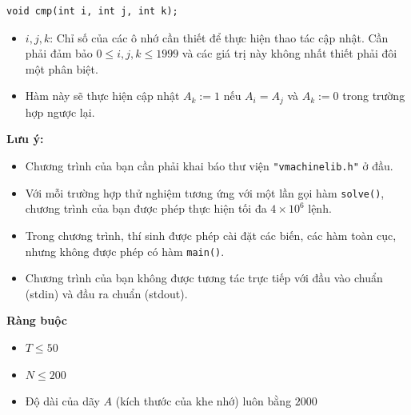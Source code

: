 \begin{lstlisting}
void cmp(int i, int j, int k);
\end{lstlisting}

\begin{itemize}
   \item $i,j,k$: Chỉ số của các ô nhớ cần thiết để thực hiện thao tác cập nhật. Cần phải đảm bảo $0\le i,j,k\le 1999$ và các giá trị này không nhất thiết phải đôi một phân biệt.
   \item Hàm này sẽ thực hiện cập nhật $A_k:=1$ nếu $A_i=A_j$ và $A_k:=0$ trong trường hợp ngược lại.
\end{itemize}

\textbf{Lưu ý:}
\begin{itemize}
   \item Chương trình của bạn cần phải khai báo thư viện \texttt{"vmachinelib.h"} ở đầu.
   \item Với mỗi trường hợp thử nghiệm tương ứng với một lần gọi hàm \texttt{solve()}, chương trình của bạn được phép thực hiện tối đa $4\times 10^6$ lệnh.
   \item Trong chương trình, thí sinh được phép cài đặt các biến, các hàm toàn cục, nhưng không được phép có hàm \texttt{main()}.
   \item Chương trình của bạn không được tương tác trực tiếp với đầu vào chuẩn (stdin) và đầu ra chuẩn (stdout).
\end{itemize}

\textbf{Ràng buộc}

\begin{itemize}
   \item $T \le 50$
   \item $N \le 200$
   \item Độ dài của dãy $A$ (kích thước của khe nhớ) luôn bằng $2000$
\end{itemize}